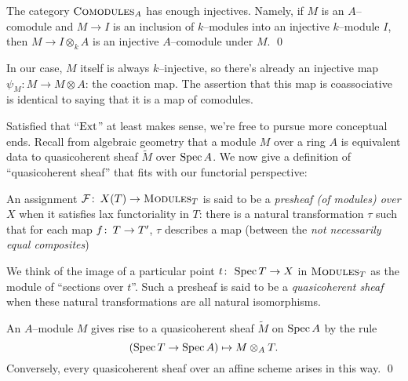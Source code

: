\begin{corollary}\label{ExtendedComodulesExist}
The category \(\normalfont\textsc{Comodules}_A\) has enough injectives.  Namely, if \(M\) is an \(A\)--comodule and \(M \to I\) is an inclusion of \(k\)--modules into an injective \(k\)--module \(I\), then \(M \to I \otimes_k A\) is an injective \(A\)--comodule under \(M\). \qed
\end{corollary}
\begin{remark}
In our case, \(M\) itself is always \(k\)--injective, so there's already an injective map \(\psi_M: M \to M \otimes A\): the coaction map.  The assertion that this map is coassociative is identical to saying that it is a map of comodules.
\end{remark}

Satisfied that ``\(\operatorname{Ext}\)'' at least makes sense, we're free to pursue more conceptual ends.  Recall from algebraic geometry that a module \(M\) over a ring \(A\) is equivalent data to quasicoherent sheaf \(\widetilde{M}\) over \(\operatorname{Spec} A\).  We now give a definition of ``quasicoherent sheaf'' that fits with our functorial perspective:
\begin{definition}\label{DefnQCohSheaves}
An assignment \(\mathcal{F}\colon\thinspace X(T) \to \normalfont\textsc{Modules}_T\) is said to be a \textit{presheaf (of modules) over \(X\)} when it satisfies lax functoriality in \(T\): there is a natural transformation \(\tau\) such that for each map \(f\colon\thinspace T \to T'\), \(\tau\) describes a map (between the \emph{not necessarily equal composites})
\begin{center}
\end{center}
We think of the image of a particular point \(t\colon\thinspace \operatorname{Spec} T \to X\) in \(\normalfont\textsc{Modules}_T\) as the module of ``sections over \(t\)''.  Such a presheaf is said to be a \textit{quasicoherent sheaf} when these natural transformations are all natural isomorphisms.
\end{definition}

\begin{lemma}\label{CorrespondenceQCohAndModules}
An \(A\)--module \(M\) gives rise to a quasicoherent sheaf \(\widetilde M\) on \(\operatorname{Spec} A\) by the rule \[(\operatorname{Spec} T \to \operatorname{Spec} A) \mapsto M \otimes_A T.\]  Conversely, every quasicoherent sheaf over an affine scheme arises in this way.  \qed
\end{lemma}

